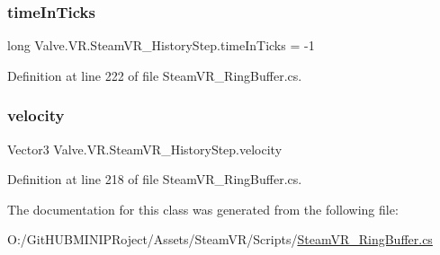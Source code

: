 \subsubsection{\texorpdfstring{timeInTicks}{timeInTicks}}
{\footnotesize\ttfamily long Valve.\+V\+R.\+Steam\+V\+R\+\_\+\+History\+Step.\+time\+In\+Ticks = -\/1}



Definition at line 222 of file Steam\+V\+R\+\_\+\+Ring\+Buffer.\+cs.

\mbox{\label{class_valve_1_1_v_r_1_1_steam_v_r___history_step_ad406c71ee18576cbcd13760d6cc4aa16}} 
\subsubsection{\texorpdfstring{velocity}{velocity}}
{\footnotesize\ttfamily Vector3 Valve.\+V\+R.\+Steam\+V\+R\+\_\+\+History\+Step.\+velocity}



Definition at line 218 of file Steam\+V\+R\+\_\+\+Ring\+Buffer.\+cs.



The documentation for this class was generated from the following file\+:\begin{DoxyCompactItemize}
\item 
O\+:/\+Git\+H\+U\+B\+M\+I\+N\+I\+P\+Roject/\+Assets/\+Steam\+V\+R/\+Scripts/\mbox{\hyperlink{_steam_v_r___ring_buffer_8cs}{Steam\+V\+R\+\_\+\+Ring\+Buffer.\+cs}}\end{DoxyCompactItemize}
